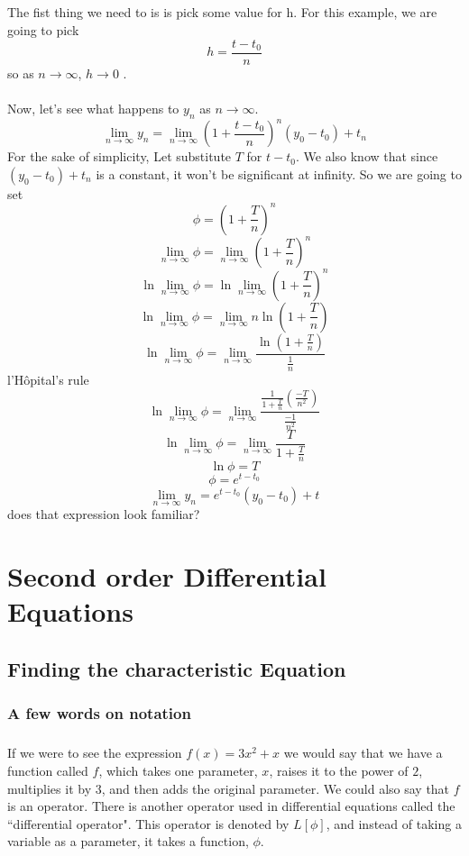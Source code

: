 \documentclass[font =22]{report}
\begin{document}
\paragraph{}
The fist thing we need to is is pick some value for h. For this example, we are going to pick
\[
h = \frac{t-t_0}{n}
\]
so as $n \to \infty$, $h \to 0$ .\\\\
Now, let's see what happens to $y_n$ as $n \to \infty.$
\[
\lim_{n \to \infty} y_n = \lim_{n \to \infty}  (1+\frac{t-t_0}{n})^n(y_0-t_0)+t_n
\]
For the sake of simplicity, Let substitute $T$ for $t-t_0$. We also know that since $(y_0-t_0)+t_n$ is a constant, it won't be significant at infinity. So we are going to set
\[
\phi = (1+\frac{T}{n})^n
\]
\[
\lim_{n \to \infty} \phi  = \lim_{n \to \infty}  (1+\frac{T}{n})^n
\]
\[
\ln \lim_{n \to \infty} \phi  = \ln \lim_{n \to \infty}  (1+\frac{T}{n})^n 
\]
 \[
 \ln \lim_{n \to \infty} \phi  = \lim_{n \to \infty}  n\ln (1+\frac{T}{n}) 
 \]
 \[
 \ln \lim_{n \to \infty} \phi  = \lim_{n \to \infty}  \frac{\ln (1+\frac{T}{n})}{\frac{1}{n}}
 \]
  l'Hôpital's rule
  \[
 \ln \lim_{n \to \infty} \phi  = \lim_{n \to \infty}  \frac{\frac{1}{1+\frac{T}{n}}\left(\frac{-T}{n^2}\right)}{\frac{-1}{n^2}}  
  \]
  \[
 \ln \lim_{n \to \infty} \phi  = \lim_{n \to \infty}  \frac{T}{1+\frac{T}{n}}  
  \]
  \[
  \ln \phi = T
  \]
  \[
  \phi = e^{t-t_0}
  \]
  \[
  \lim_{n\to\infty}y_n = e^{t-t_0}(y_0-t_0)+t 
  \]
does that expression look familiar?

\chapter{Second order Differential Equations}
\section{Finding the characteristic Equation}
\subsection*{A few words on notation}
\paragraph{}
If we were to see the expression $f(x) = 3x^2+x$ we would say that we have a function called $f$, which takes one parameter, $x$, raises it to the power of $2$, multiplies it by $3$, and then adds the original parameter. We could also say that $f$ is an operator. There is another operator used in differential equations called the ``differential operator". This operator is denoted by $L[\phi]$, and instead of taking a variable as a parameter, it takes a function, $\phi$.
\end{document}
